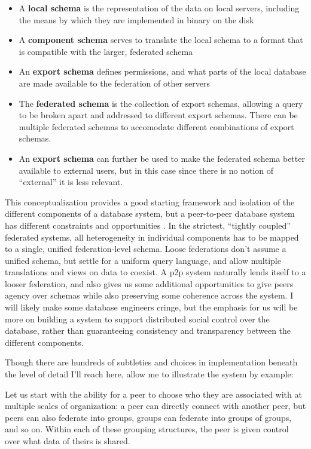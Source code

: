 \documentclass[10pt]{article}
\begin{document}
\begin{multicols}{2}
\begin{itemize}
\item
  A \textbf{local schema} is the representation of the data on local
  servers, including the means by which they are implemented in binary
  on the disk
\item
  A \textbf{component schema} serves to translate the local schema to a
  format that is compatible with the larger, federated schema
\item
  An \textbf{export schema} defines permissions, and what parts of the
  local database are made available to the federation of other servers
\item
  The \textbf{federated schema} is the collection of export schemas,
  allowing a query to be broken apart and addressed to different export
  schemas. There can be multiple federated schemas to accomodate
  different combinations of export schemas.
\item
  An \textbf{export schema} can further be used to make the federated
  schema better available to external users, but in this case since
  there is no notion of ``external'' it is less relevant.
\end{itemize}

This conceptualization provides a good starting framework and isolation
of the different components of a database system, but a peer-to-peer
database system has different constraints and opportunities \cite{bonifatiDistributedDatabasesPeertopeer2008} . In the strictest,
``tightly coupled'' federated systems, all heterogeneity in individual
components has to be mapped to a single, unified federation-level
schema. Loose federations don't assume a unified schema, but settle for
a uniform query language, and allow multiple translations and views on
data to coexist. A p2p system naturally lends itself to a looser
federation, and also gives us some additional opportunities to give
peers agency over schemas while also preserving some coherence across
the system. I will likely make some database engineers cringe, but the
emphasis for us will be more on building a system to support distributed
social control over the database, rather than guaranteeing consistency
and transparency between the different components.

Though there are hundreds of subtleties and choices in implementation
beneath the level of detail I'll reach here, allow me to illustrate the
system by example:

Let us start with the ability for a peer to choose who they are
associated with at multiple scales of organization: a peer can directly
connect with another peer, but peers can also federate into groups,
groups can federate into groups of groups, and so on. Within each of
these grouping structures, the peer is given control over what data of
theirs is shared.


\end{multicols}
\end{document}
